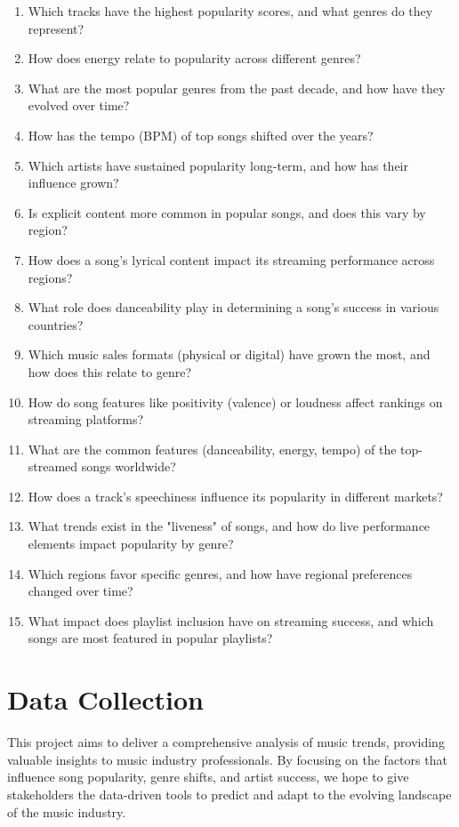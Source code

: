 \documentclass[12pt]{article}
\begin{document}
\begin{enumerate}
  \item Which tracks have the highest popularity scores, and what genres do they represent?
  \item How does energy relate to popularity across different genres?
  \item What are the most popular genres from the past decade, and how have they evolved over time?
  \item How has the tempo (BPM) of top songs shifted over the years?
  \item Which artists have sustained popularity long-term, and how has their influence grown?
  \item Is explicit content more common in popular songs, and does this vary by region?
  \item How does a song's lyrical content impact its streaming performance across regions?
  \item What role does danceability play in determining a song's success in various countries?
  \item Which music sales formats (physical or digital) have grown the most, and how does this relate to genre?
  \item How do song features like positivity (valence) or loudness affect rankings on streaming platforms?
  \item What are the common features (danceability, energy, tempo) of the top-streamed songs worldwide?
  \item How does a track's speechiness influence its popularity in different markets?
  \item What trends exist in the "liveness" of songs, and how do live performance elements impact popularity by genre?
  \item Which regions favor specific genres, and how have regional preferences changed over time?
  \item What impact does playlist inclusion have on streaming success, and which songs are most featured in popular playlists?
\end{enumerate}

\section*{Data Collection}
This project aims to deliver a comprehensive analysis of music trends, providing valuable insights to music industry professionals. By focusing on the factors that influence song popularity, genre shifts, and artist success, we hope to give stakeholders the data-driven tools to predict and adapt to the evolving landscape of the music industry.
\end{document}
